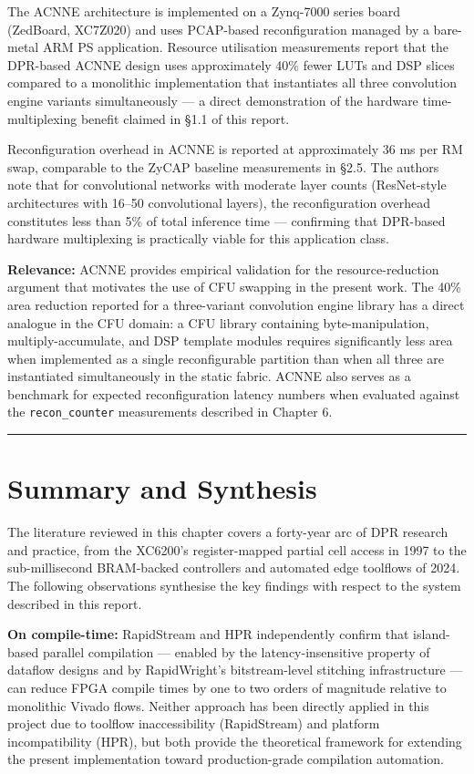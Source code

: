 The ACNNE architecture is implemented on a Zynq-7000 series board (ZedBoard, XC7Z020) and uses PCAP-based reconfiguration managed by a bare-metal ARM PS application. Resource utilisation measurements report that the DPR-based ACNNE design uses approximately 40\% fewer LUTs and DSP slices compared to a monolithic implementation that instantiates all three convolution engine variants simultaneously — a direct demonstration of the hardware time-multiplexing benefit claimed in §1.1 of this report.

Reconfiguration overhead in ACNNE is reported at approximately 36 ms per RM swap, comparable to the ZyCAP baseline measurements in §2.5. The authors note that for convolutional networks with moderate layer counts (ResNet-style architectures with 16–50 convolutional layers), the reconfiguration overhead constitutes less than 5\% of total inference time — confirming that DPR-based hardware multiplexing is practically viable for this application class.

\textbf{Relevance:} ACNNE provides empirical validation for the resource-reduction argument that motivates the use of CFU swapping in the present work. The 40\% area reduction reported for a three-variant convolution engine library has a direct analogue in the CFU domain: a CFU library containing byte-manipulation, multiply-accumulate, and DSP template modules requires significantly less area when implemented as a single reconfigurable partition than when all three are instantiated simultaneously in the static fabric. ACNNE also serves as a benchmark for expected reconfiguration latency numbers when evaluated against the \texttt{recon\_counter} measurements described in Chapter 6.

\vspace{0.4em}\hrule\vspace{0.4em}

\section{Summary and Synthesis}

The literature reviewed in this chapter covers a forty-year arc of DPR research and practice, from the XC6200's register-mapped partial cell access in 1997 to the sub-millisecond BRAM-backed controllers and automated edge toolflows of 2024. The following observations synthesise the key findings with respect to the system described in this report.

\textbf{On compile-time:} RapidStream and HPR independently confirm that island-based parallel compilation — enabled by the latency-insensitive property of dataflow designs and by RapidWright's bitstream-level stitching infrastructure — can reduce FPGA compile times by one to two orders of magnitude relative to monolithic Vivado flows. Neither approach has been directly applied in this project due to toolflow inaccessibility (RapidStream) and platform incompatibility (HPR), but both provide the theoretical framework for extending the present implementation toward production-grade compilation automation.

